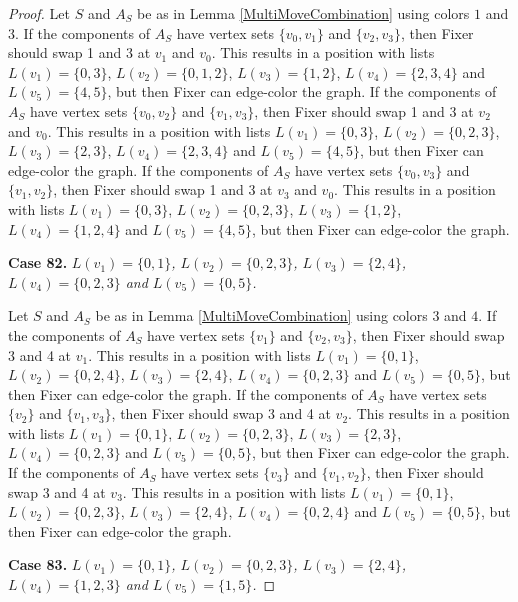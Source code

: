 \documentclass[12pt]{amsart}
\theoremstyle{plain}
\theoremstyle{definition}
\theoremstyle{remark}
\begin{document}
\begin{proof}
Let $S$ and $A_S$ be as in Lemma \ref{MultiMoveCombination} using colors $1$ and $3$. If the components of $A_S$ have vertex sets $\{v_0, v_1\}$ and $\{v_2, v_3\}$, then Fixer should swap 1 and 3 at $v_1$ and $v_0$. This results in a position with lists $L(v_1) = \{0, 3\}$, $L(v_2) = \{0, 1, 2\}$, $L(v_3) = \{1, 2\}$, $L(v_4) = \{2, 3, 4\}$ and $L(v_5) = \{4, 5\}$, but then Fixer can edge-color the graph.
If the components of $A_S$ have vertex sets $\{v_0, v_2\}$ and $\{v_1, v_3\}$, then Fixer should swap 1 and 3 at $v_2$ and $v_0$. This results in a position with lists $L(v_1) = \{0, 3\}$, $L(v_2) = \{0, 2, 3\}$, $L(v_3) = \{2, 3\}$, $L(v_4) = \{2, 3, 4\}$ and $L(v_5) = \{4, 5\}$, but then Fixer can edge-color the graph.
If the components of $A_S$ have vertex sets $\{v_0, v_3\}$ and $\{v_1, v_2\}$, then Fixer should swap 1 and 3 at $v_3$ and $v_0$. This results in a position with lists $L(v_1) = \{0, 3\}$, $L(v_2) = \{0, 2, 3\}$, $L(v_3) = \{1, 2\}$, $L(v_4) = \{1, 2, 4\}$ and $L(v_5) = \{4, 5\}$, but then Fixer can edge-color the graph.

\noindent\textbf{Case 82.  }\textit{$L(v_1) = \{0, 1\}$, $L(v_2) = \{0, 2, 3\}$, $L(v_3) = \{2, 4\}$, $L(v_4) = \{0, 2, 3\}$ and $L(v_5) = \{0, 5\}$.}

Let $S$ and $A_S$ be as in Lemma \ref{MultiMoveCombination} using colors $3$ and $4$. If the components of $A_S$ have vertex sets $\{v_1\}$ and $\{v_2, v_3\}$, then Fixer should swap 3 and 4 at $v_1$. This results in a position with lists $L(v_1) = \{0, 1\}$, $L(v_2) = \{0, 2, 4\}$, $L(v_3) = \{2, 4\}$, $L(v_4) = \{0, 2, 3\}$ and $L(v_5) = \{0, 5\}$, but then Fixer can edge-color the graph.
If the components of $A_S$ have vertex sets $\{v_2\}$ and $\{v_1, v_3\}$, then Fixer should swap 3 and 4 at $v_2$. This results in a position with lists $L(v_1) = \{0, 1\}$, $L(v_2) = \{0, 2, 3\}$, $L(v_3) = \{2, 3\}$, $L(v_4) = \{0, 2, 3\}$ and $L(v_5) = \{0, 5\}$, but then Fixer can edge-color the graph.
If the components of $A_S$ have vertex sets $\{v_3\}$ and $\{v_1, v_2\}$, then Fixer should swap 3 and 4 at $v_3$. This results in a position with lists $L(v_1) = \{0, 1\}$, $L(v_2) = \{0, 2, 3\}$, $L(v_3) = \{2, 4\}$, $L(v_4) = \{0, 2, 4\}$ and $L(v_5) = \{0, 5\}$, but then Fixer can edge-color the graph.

\noindent\textbf{Case 83.  }\textit{$L(v_1) = \{0, 1\}$, $L(v_2) = \{0, 2, 3\}$, $L(v_3) = \{2, 4\}$, $L(v_4) = \{1, 2, 3\}$ and $L(v_5) = \{1, 5\}$.}


\end{proof}
\end{document}
